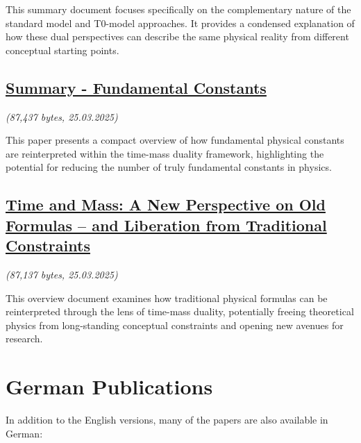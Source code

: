 \documentclass[a4paper,12pt]{article}
\newcommand{\repobase}{https://github.com/jpascher/T0-Time-Mass-Duality/tree/main/2/}
\begin{document}
	This summary document focuses specifically on the complementary nature of the standard model and T0-model approaches. It provides a condensed explanation of how these dual perspectives can describe the same physical reality from different conceptual starting points.
	
	\subsection{\href{\repobase pdf/English/summary-fundamental-constants.pdf}{Summary - Fundamental Constants}}
	\textit{(87,437 bytes, 25.03.2025)}
	
	This paper presents a compact overview of how fundamental physical constants are reinterpreted within the time-mass duality framework, highlighting the potential for reducing the number of truly fundamental constants in physics.
	
	\subsection{\href{\repobase pdf/English/Time and Mass A New Perspective on Old Formulas – and Liberation from Traditional Constraints.pdf}{Time and Mass: A New Perspective on Old Formulas – and Liberation from Traditional Constraints}}
	\textit{(87,137 bytes, 25.03.2025)}
	
	This overview document examines how traditional physical formulas can be reinterpreted through the lens of time-mass duality, potentially freeing theoretical physics from long-standing conceptual constraints and opening new avenues for research.
	
	\section{German Publications}
	
	In addition to the English versions, many of the papers are also available in German:
	
\end{document}
